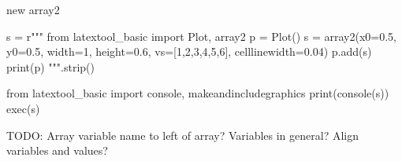 \newpage
new array2
\begin{python}
s = r"""
from latextool_basic import Plot, array2
p = Plot()
s = array2(x0=0.5, y0=0.5, width=1, height=0.6, 
           vs=[1,2,3,4,5,6],
           celllinewidth=0.04)
p.add(s)
print(p)
""".strip()

from latextool_basic import console, makeandincludegraphics
print(console(s))
exec(s)
\end{python}



TODO: Array variable name to left of array?
Variables in general?
Align variables and values?
